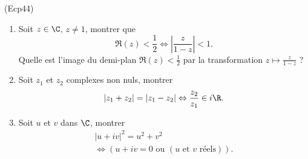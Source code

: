 \begin{tiny}(Ecp44)\end{tiny}
\begin{enumerate}
 \item Soit $z\in \C$, $z\neq 1$, montrer que 
\[
 \Re(z) < \frac{1}{2} \Leftrightarrow \left| \frac{z}{1-z}\right| < 1.
\]
Quelle est l'image du demi-plan $\Re(z)<\frac{1}{2}$ par la transformation $z\mapsto \frac{z}{1-z}$ ?

 \item Soit $z_1$ et $z_2$ complexes non nuls, montrer
\[
 \left|z_1 + z_2\right| = \left|z_1 - z_2\right| \Leftrightarrow \frac{z_2}{z_1} \in i\R.
\]

 \item Soit $u$ et $v$ dans $\C$, montrer
\begin{multline*}
\left| u + iv \right|^2 = u^2 + v^2 \\
\Leftrightarrow \left( u+iv = 0 \text{ ou } ( u \text{ et } v \text{ réels}) \right) .
\end{multline*}

\end{enumerate}
